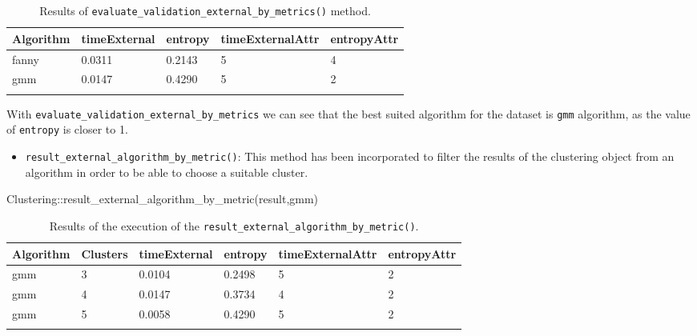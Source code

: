 \documentclass[
]{article}
\newenvironment{Shaded}{\begin{snugshade}}{\end{snugshade}}
\newcommand{\FunctionTok}[1]{\textcolor[rgb]{0.00,0.00,0.00}{#1}}
\newcommand{\NormalTok}[1]{#1}
\newcommand{\SpecialCharTok}[1]{\textcolor[rgb]{0.00,0.00,0.00}{#1}}
\newcommand{\StringTok}[1]{\textcolor[rgb]{0.31,0.60,0.02}{#1}}
\providecommand{\tightlist}{%
  \setlength{\itemsep}{0pt}\setlength{\parskip}{0pt}}
\begin{document}
\begin{longtable}{| p{1.3cm} | p{1.6cm} | p{0.8cm} | p{2.2cm} | p{1.8cm} |}
\hline
\scriptsize Algorithm & \scriptsize timeExternal & \scriptsize entropy & \scriptsize timeExternalAttr & \scriptsize entropyAttr \\
\hline
\scriptsize   fanny   & \scriptsize    0.0311    & \scriptsize 0.2143  & \scriptsize        5         & \scriptsize     4 \\
\scriptsize    gmm    & \scriptsize    0.0147    & \scriptsize 0.4290  & \scriptsize        5         & \scriptsize     2  \\
\hline
\caption{Results of \texttt{evaluate\_validation\_external\_by\_metrics()} method.}
\label{tab:evaluatevalidationexternalbymetrics}
\end{longtable}

With \texttt{evaluate\_validation\_external\_by\_metrics} we can see
that the best suited algorithm for the dataset is \texttt{gmm}
algorithm, as the value of \texttt{entropy} is closer to 1.

\begin{itemize}
\tightlist
\item
  \texttt{result\_external\_algorithm\_by\_metric()}: This method has
  been incorporated to filter the results of the clustering object from
  an algorithm in order to be able to choose a suitable cluster.
\end{itemize}

\begin{Shaded}
\begin{Highlighting}[]
\NormalTok{Clustering}\SpecialCharTok{::}\FunctionTok{result\_external\_algorithm\_by\_metric}\NormalTok{(result,}\StringTok{\textquotesingle{}gmm\textquotesingle{}}\NormalTok{)}
\end{Highlighting}
\end{Shaded}

\begin{longtable}{| p{1.3cm} | p{1.5cm} | p{1.7cm} | p{1.2cm} | p{2.1cm} | p{1.8cm} |}
\hline
\scriptsize Algorithm & \scriptsize Clusters & \scriptsize timeExternal & \scriptsize entropy & \scriptsize timeExternalAttr & \scriptsize entropyAttr  \\
\hline
\scriptsize    gmm    & \scriptsize     3    & \scriptsize    0.0104    & \scriptsize 0.2498  & \scriptsize         5        & \scriptsize       2 \\
\scriptsize    gmm    & \scriptsize     4    & \scriptsize    0.0147    & \scriptsize 0.3734  & \scriptsize         4        & \scriptsize       2 \\
\scriptsize    gmm    & \scriptsize     5    & \scriptsize    0.0058    & \scriptsize  0.4290  & \scriptsize         5        & \scriptsize       2 \\
\hline
\caption{Results of the execution of the \texttt{result\_external\_algorithm\_by\_metric()}.}
\label{tab:resultexternalalgorithmbymetric}
\end{longtable}
\end{document}

